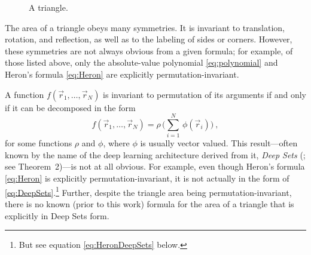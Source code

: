 \documentclass[10pt]{article}
\begin{document}
\begin{figure}[t!]
    \caption{A triangle.}
    \label{fig:triangle}
\end{figure}

The area of a triangle obeys many symmetries. It is invariant to translation, rotation, and reflection, as well as to the labeling of sides or corners. However, these symmetries are not always obvious from a given formula; for example, of those listed above, only the absolute-value polynomial \eqref{eq:polynomial} and Heron's formula \eqref{eq:Heron} are explicitly permutation-invariant.

A function $f(\vec{r}_1, \dots, \vec{r}_N)$ is invariant to permutation of its arguments if and only if it can be decomposed in the form
\begin{equation}
    f(\vec{r}_1, \dots, \vec{r}_N) = \rho \, \big( \sum_{i=1}^{N} \, \phi(\vec{r}_i) \big)~,\label{eq:DeepSets}
\end{equation}
for some functions $\rho$ and $\phi$, where $\phi$ is usually vector valued.
This result---often known by the name of the deep learning architecture derived from it, \emph{Deep Sets} (\citealt{Zaheer+17deepsets}; see Theorem~2)---is not at all obvious.
For example, even though Heron's formula \eqref{eq:Heron} is explicitly permutation-invariant, it is not actually in the form of \eqref{eq:DeepSets}.\footnote{But see equation \eqref{eq:HeronDeepSets} below.}
Further, despite the triangle area being permutation-invariant, there is no known (prior to this work) formula for the area of a triangle that is explicitly in Deep Sets form.
\end{document}
